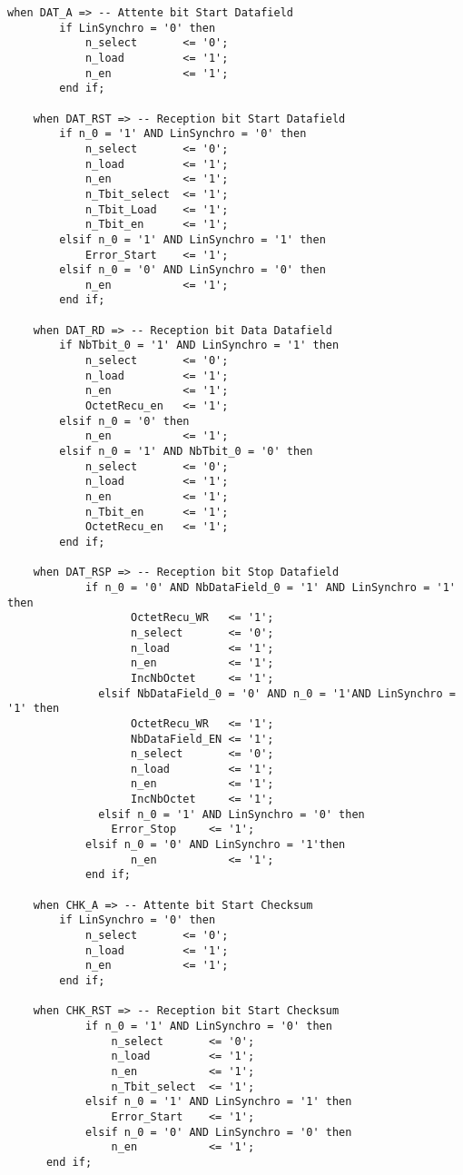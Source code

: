 \begin{lstlisting}[style=VHDLStyle, caption={Réseau Combinatoire de Sortie Reception Trame}]
    when DAT_A => -- Attente bit Start Datafield
        if LinSynchro = '0' then
            n_select       <= '0';
            n_load         <= '1';
            n_en           <= '1';
        end if;   
        
    when DAT_RST => -- Reception bit Start Datafield
        if n_0 = '1' AND LinSynchro = '0' then
            n_select       <= '0';
            n_load         <= '1';
            n_en           <= '1';
            n_Tbit_select  <= '1';
            n_Tbit_Load    <= '1';
            n_Tbit_en      <= '1';
        elsif n_0 = '1' AND LinSynchro = '1' then
            Error_Start    <= '1';
        elsif n_0 = '0' AND LinSynchro = '0' then
            n_en           <= '1';
        end if;  
               
    when DAT_RD => -- Reception bit Data Datafield
        if NbTbit_0 = '1' AND LinSynchro = '1' then
            n_select       <= '0';
            n_load         <= '1';
            n_en           <= '1';
            OctetRecu_en   <= '1';
        elsif n_0 = '0' then
            n_en           <= '1';
        elsif n_0 = '1' AND NbTbit_0 = '0' then
            n_select       <= '0';
            n_load         <= '1';
            n_en           <= '1';
            n_Tbit_en      <= '1';
            OctetRecu_en   <= '1';
        end if; 
                 
   	when DAT_RSP => -- Reception bit Stop Datafield
		    if n_0 = '0' AND NbDataField_0 = '1' AND LinSynchro = '1' then
    			   OctetRecu_WR   <= '1';
    			   n_select       <= '0';
    			   n_load         <= '1';
    			   n_en           <= '1';
    			   IncNbOctet     <= '1';
    		  elsif NbDataField_0 = '0' AND n_0 = '1'AND LinSynchro = '1' then
    			   OctetRecu_WR   <= '1';
    			   NbDataField_EN <= '1';
    			   n_select       <= '0';
    			   n_load         <= '1';
    			   n_en           <= '1';
    			   IncNbOctet     <= '1';
    		  elsif n_0 = '1' AND LinSynchro = '0' then
    		    Error_Stop     <= '1';
 		    elsif n_0 = '0' AND LinSynchro = '1'then
    			   n_en           <= '1';
    		end if;  
          
    when CHK_A => -- Attente bit Start Checksum
        if LinSynchro = '0' then
            n_select       <= '0';
            n_load         <= '1';
            n_en           <= '1';
        end if;   
                
    when CHK_RST => -- Reception bit Start Checksum
    		if n_0 = '1' AND LinSynchro = '0' then
                n_select       <= '0';
                n_load         <= '1';
                n_en           <= '1';
                n_Tbit_select  <= '1';
    		elsif n_0 = '1' AND LinSynchro = '1' then
                Error_Start    <= '1';
    		elsif n_0 = '0' AND LinSynchro = '0' then
                n_en           <= '1';
      end if;  
               

\end{lstlisting}
